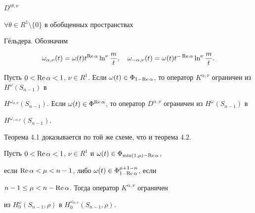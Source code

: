 $D^{i\theta,\nu}$


$\forall \theta \in R^1\setminus \{0\}$ в обобщенных пространствах


Г\"ельдера. Обозначим


$$


\omega_{\alpha,\nu}(t) = \omega(t) t^{\re \alpha} \ln^\nu \frac{m}{t},


\quad \omega_{-\alpha,\nu}(t) = \omega(t) t^{-\re \alpha} \ln^\nu


\frac{m}{t}.


$$





\begin{thms}


Пусть $0 < \re \alpha < 1$, $\nu\in R^1$. Если $\omega(t) \in \Phi_{1-\re


\alpha}$, то оператор $K^{\alpha,\nu}$ ограничен из $H^\omega(S_{n-1})$ в


$H^{\omega_{\alpha,\nu}}(S_{n-1})$. Если $\omega(t) \in \Phi^{\re


\alpha}$, то оператор $D^{\alpha,\nu}$ ограничен из $H^\omega(S_{n-1})$ в


$H^{\omega_{-\alpha,\nu}}(S_{n-1})$.


\end{thms}





Теорема 4.1 доказывается по той же схеме, что и теорема 4.2.





\begin{thms}


Пусть $0 < \re \alpha < 1$, $\nu\in R^1$ и $\omega(t) \in \Phi_{\min(1,\mu)-


\re \alpha}$,


если $\re \alpha <\mu < n-1$, либо $\omega(t) \in \Phi_{1-\re


\alpha}^{\mu+1-n}$, если


$n-1 \leq \mu < n-\operatorname{Re} \alpha$. Тогда оператор $K^{\alpha,\nu}$ ограничен


из $H_0^\omega(S_{n-1},\rho)$ в $H_0^{\omega_{\alpha,\nu}}(S_{n-1},\rho)$.


\end{thms}





